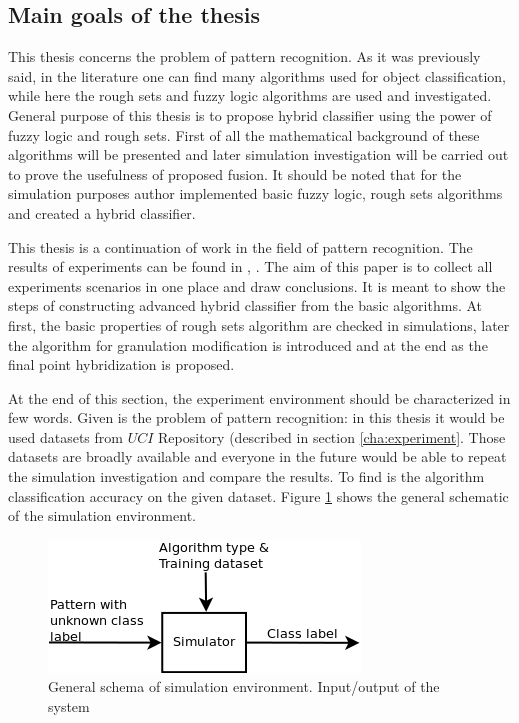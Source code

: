 \subsection{Main goals of the thesis}
This thesis concerns the problem of pattern recognition. As it was previously
said, in the literature one can find many algorithms used for object
classification, while here the rough sets and fuzzy logic algorithms are used 
and investigated. General purpose of this thesis is to propose hybrid
classifier using the power of fuzzy logic and rough sets. First of all the
mathematical background of these algorithms will be presented and later
simulation investigation will be carried out to prove the usefulness of
proposed fusion. It should be noted that for the simulation purposes author
implemented basic fuzzy logic, rough sets algorithms and created a hybrid
classifier.

This thesis is a continuation of work in the field of pattern recognition.
The results of experiments can be found in \cite{bib1}, \cite{bib2}. The aim of
this paper is to collect all experiments scenarios in one place and draw
conclusions. It is meant to show the steps of constructing advanced hybrid
classifier from the basic algorithms. At first, the basic properties of rough
sets algorithm are checked in simulations, later the algorithm for granulation
modification is introduced and at the end as the final point hybridization is
proposed.

At the end of this section, the experiment environment should be characterized in
few words. Given is the problem of pattern recognition: in this thesis it would
be used datasets from $UCI$ Repository (described in section
\ref{cha:experiment}. Those datasets are broadly available and everyone in the
future would be able to repeat the simulation investigation and compare the
results. To find is the algorithm classification accuracy on the given dataset.
Figure \ref{fig:input_output} shows the general schematic of the simulation
environment.
\begin{figure}[H]
    \begin{center}
        \includegraphics[width=\textwidth, height=0.5\textwidth]{fig/schema.png}
    \end{center}
    \caption{General schema of simulation environment. Input/output of the
    system}
    \label{fig:input_output}
\end{figure}

